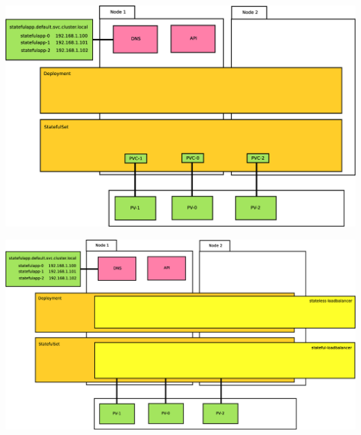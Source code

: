 \documentclass{beamer}
\begin{document}
\begin{frame}
\includegraphics[width=\textwidth,height=\textheight,keepaspectratio]{graphics/07-persistentIdentity.eps}
\end{frame}

\begin{frame}
\includegraphics[width=\textwidth,height=\textheight,keepaspectratio]{graphics/08-loadBalancer.eps}
\end{frame}
\end{document}
